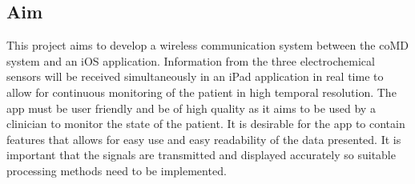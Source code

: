 \subsection{Aim}
This project aims to develop a wireless communication system between the coMD system and an iOS application. Information from the three electrochemical sensors will be received simultaneously in an iPad application in real time to allow for continuous monitoring of the patient in high temporal resolution. The app must be user friendly and be of high quality as it aims to be used by a clinician to monitor the state of the patient. It is desirable for the app to contain features that allows for easy use and easy readability of the data presented. It is important that the signals are transmitted and displayed accurately so suitable processing methods need to be implemented. 

